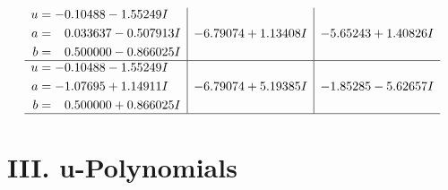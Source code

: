 \documentclass[1p]{elsarticle_modified}
\theoremstyle{definition}
\begin{document}
$$\begin{array}{c|c|c}
\begin{aligned}
u &= -0.10488 - 1.55249 I \\
a &= \phantom{-}0.033637 - 0.507913 I \\
b &= \phantom{-}0.500000 - 0.866025 I\end{aligned}
 & -6.79074 + 1.13408 I & -5.65243 + 1.40826 I \\ \hline\begin{aligned}
u &= -0.10488 - 1.55249 I \\
a &= -1.07695 + 1.14911 I \\
b &= \phantom{-}0.500000 + 0.866025 I\end{aligned}
 & -6.79074 + 5.19385 I & -1.85285 - 5.62657 I\\
 \hline 
 \end{array}$$\newpage
\newpage\renewcommand{\arraystretch}{1}
\centering \section*{ III. u-Polynomials}
\end{document}
